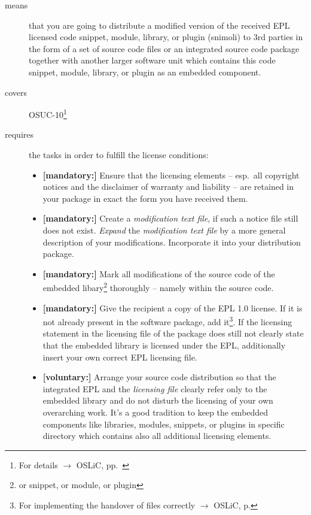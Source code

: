 \begin{description}
\item[means] that you are going to distribute a modified version of the received
EPL licensed code snippet, module, library, or plugin (snimoli) to 3rd
parties in the form of a set of source code files or an integrated source code
package together with another larger software unit which contains this code
snippet, module, library, or plugin as an embedded component.
\item[covers] OSUC-10\footnote{For details $\rightarrow$ OSLiC, pp.\ \pageref{OSUC-10-DEF}}
\item[requires] the tasks in order to fulfill the license conditions:
\begin{itemize}

  \item \textbf{[mandatory:]} Ensure that the licensing elements -- esp.\ all
  copyright notices and the disclaimer of warranty and liability -- are retained
  in your package in exact the form you have received them.

  \item \textbf{[mandatory:]} Create a \emph{modification text file}, if such a
  notice file still does not exist. \emph{Expand} the \emph{modification text
  file} by a more general description of your modifications. Incorporate it into
  your distribution package.
  
  \item \textbf{[mandatory:]} Mark all modifications of the source code of the
  embedded libary\footnote{or snippet, or module, or plugin} thoroughly --
  namely within the source code.
   
  \item \textbf{[mandatory:]} Give the recipient a copy of the EPL 1.0 license.
  If it is not already present in the software package, add it\footnote{For
  implementing the handover of files correctly $\rightarrow$ OSLiC, p.
  \pageref{DistributingFilesHint}}. If the licensing statement in the licensing
  file of the package does still not clearly state that the embedded library is
  licensed under the EPL, additionally insert your own correct EPL licensing file.
     
  \item \textbf{[voluntary:]} Arrange your source code distribution so that the
  integrated EPL and the \emph{licensing file} clearly refer only to the
  embedded library and do not disturb the licensing of your own overarching
  work. It's a good tradition to keep the embedded components like libraries,
  modules, snippets, or plugins in specific directory which contains also all
  additional licensing elements.
  

\end{itemize}
\end{description}
